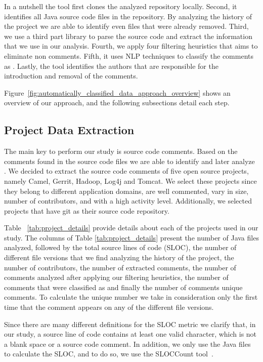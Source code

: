 In a nutshell the tool first clones the analyzed repository locally. Second, it identifies all Java source code files in the repository. By analyzing the history of the project we are able to identify even files that were already removed. Third, we use a third part library to parse the source code and extract the information that we use in our analysis. Fourth, we apply four filtering heuristics that aims to eliminate non \SATD comments. Fifth, it uses NLP techniques to classify the comments as \SATD. Lastly, the tool identifies the authors that are responsible for the introduction and removal of the \SATD comments. 

Figure~\ref{fig:automatically_classified_data_approach_overview} shows an overview of our approach, and the following subsections detail each step.

\subsection{Project Data Extraction}
\label{sub:project_data_extraction}

The main key to perform our study is source code comments. Based on the comments found in the source code files we are able to identify and later analyze \SATD. We decided to extract the source code comments of five open source projects, namely Camel, Gerrit, Hadoop, Log4j and Tomcat. We select these projects since they belong to different application domains, are well commented, vary in size, number of contributors, and with a high activity level. Additionally, we selected projects that have git as their source code repository.

Table ~\ref{tab:project_details} provide details about each of the projects used in our study. The columns of Table \ref{tab:project_details} present the number of Java files analyzed, followed by the total source lines of code (SLOC), the number of different file versions that we find analyzing the history of the project, the number of contributors, the number of extracted comments, the number of comments analyzed after applying our filtering heuristics, the number of comments that were classified as \SATD and finally the number of comments unique \SATD comments. To calculate the unique \SATD number we take in consideration only the first time that the comment appears on any of the different file versions. 

Since there are many different definitions for the SLOC metric we clarify that, in our study, a source line of code contains at least one valid character, which is not a blank space or a source code comment. In addition, we only use the Java files to calculate the SLOC, and to do so, we use the SLOCCount tool~\cite{wheeler2004:home}. 

